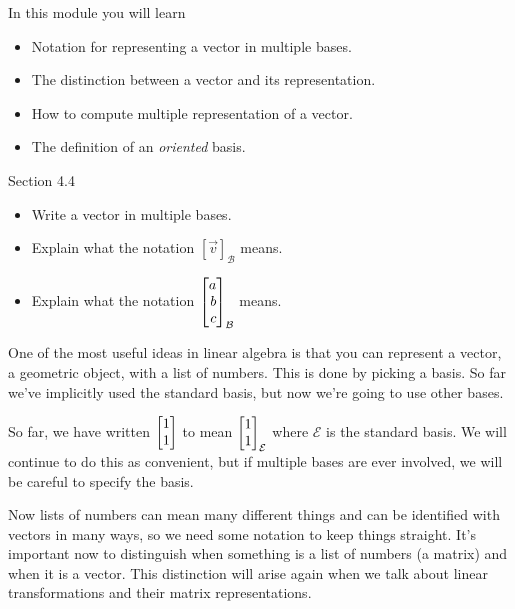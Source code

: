 \begin{module}

	In this module you will learn
	\begin{itemize}
		\item Notation for representing a vector in multiple bases.
		\item The distinction between a vector and its representation.
		\item How to compute multiple representation of a vector.
		\item The definition of an \emph{oriented} basis.
	\end{itemize}

	
	
\end{module}
\begin{lesson}

	Section 4.4

	\begin{itemize}
		\item Write a vector in multiple bases.
		\item Explain what the notation $[\vec v]_{\mathcal B}$ means.
		\item Explain what the notation $\mat{a\\b\\c}_{\mathcal B}$ means.
	\end{itemize}

	One of the most useful ideas in linear algebra is that you can
	represent a vector, a geometric object, with a list of numbers. This
	is done by picking a basis. So far we've implicitly used the standard basis,
	but now we're going to use other bases.

	\begin{annotation}
		\begin{notes}
			So far, we have written $\mat{1\\1}$ to mean
			$\mat{1\\1}_{\mathcal E}$ where $\mathcal E$ is the
			standard basis. We will continue to do this as convenient,
			but if multiple bases are ever involved, we will be careful
			to specify the basis.
		\end{notes}
	\end{annotation}
	Now lists of numbers can mean many different things and can be identified
	with vectors in many ways, so we need some notation to keep things straight.
	It's important now to distinguish when something is a list of numbers (a matrix)
	and when it is a vector. This distinction will arise again when
	we talk about linear transformations and their matrix representations.

\end{lesson}
	\bookonlynewpage
